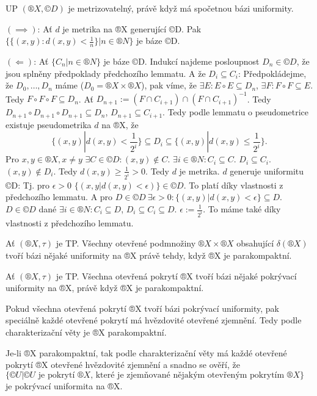 \documentclass[12pt]{article}                   %
\begin{document}
    \begin{veta}[Metrizovatelnost UP]
        UP $(®X, ©D)$ je metrizovatelný, právě když má spočetnou bázi uniformity.

        \begin{dukazin}
            $(\implies)$: Ať $d$ je metrika na ®X generující ©D. Pak $\{\{(x, y): d(x, y) < \frac{1}{n}\} | n \in ®N\}$ je báze ©D.

            $(\Leftarrow)$: Ať $\{C_n | n \in ®N\}$ je báze ©D. Indukcí najdeme posloupnost $D_n \in ©D$, že jsou splněny předpoklady předchozího lemmatu. A že $D_i \subseteq C_i$: Předpokládejme, že $D_0, …, D_n$ máme ($D_0 = ®X \times ®X$), pak víme, že $\exists E: E \circ E \subseteq D_n$, $\exists F: F \circ F \subseteq E$. Tedy $F \circ F \circ F \subseteq D_n$. Ať $D_{n+1} := (F \cap C_{i+1}) \cap (F \cap C_{i+1})^{-1}$. Tedy $D_{n+1}\circ D_{n+1} \circ D_{n+1} \subseteq D_n$, $D_{n+1} \subseteq C_{i+1}$. Tedy podle lemmatu o pseudometrice existuje pseudometrika $d$ na ®X, že
            $$ \{(x, y) | d(x, y) < \frac{1}{2^i}\} \subseteq D_i \subseteq \{(x, y) | d(x, y) ≤ \frac{1}{2^i}\}. $$
            Pro $x, y \in ®X, x≠y$ $\exists C \in ©D: (x, y) \notin C$. $\exists i \in ®N: C_i \subseteq C$. $D_i \subseteq C_i$. $(x, y)\notin D_i$. Tedy $d(x, y) ≥ \frac{1}{2^i} > 0$. Tedy $d$ je metrika. $d$ generuje uniformitu ©D: Tj. pro $\epsilon > 0$ $\{(x, y | d(x, y) < \epsilon)\} \in ©D$. To platí díky vlastnosti z předchozího lemmatu. A pro $D \in ©D\ \exists \epsilon > 0: \{(x, y) | d(x, y) < \epsilon\} \subseteq D$. $D \in ©D$ dané $\exists i \in ®N: C_i \subseteq D$, $D_i \subseteq C_i \subseteq D$. $\epsilon := \frac{1}{2^i}$. To máme také díky vlastnosti z předchozího lemmatu.
        \end{dukazin}
    \end{veta}

    \begin{veta}
        Ať $(®X, \tau)$ je TP. Všechny otevřené podmnožiny $®X \times ®X$ obsahující $\delta(®X)$ tvoří bázi nějaké uniformity na ®X právě tehdy, když ®X je parakompaktní.

        \begin{poznamkain}[Reformulace]
            Ať $(®X, \tau)$ je TP. Všechna otevřená pokrytí ®X tvoří bázi nějaké pokrývací uniformity na ®X, právě když ®X je parakompaktní.
        \end{poznamkain}

        \begin{dukazin}
            Pokud všechna otevřená pokrytí ®X tvoří bázi pokrývací uniformity, pak speciálně každé otevřené pokrytí má hvězdovité otevřené zjemnění. Tedy podle charakterizační věty je ®X parakompaktní.

            Je-li ®X parakompaktní, tak podle charakterizační věty má každé otevřené pokrytí ®X otevřené hvězdovité zjemnění a snadno se ověří, že $\{©U | ©U \text{ je pokrytí } ®X \text{, které je zjemňované nějakým otevřeným pokrytím } ®X\}$ je pokrývací uniformita na ®X.
        \end{dukazin}
    \end{veta}
\end{document}
